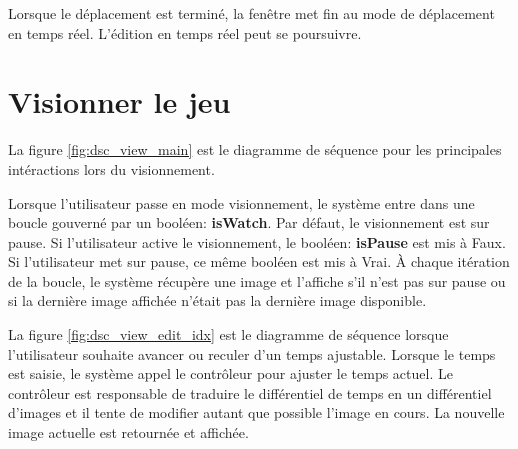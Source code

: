 Lorsque le déplacement est terminé, la fenêtre met fin au mode de déplacement en temps réel.
L'édition en temps réel peut se poursuivre.

\section{Visionner le jeu}
\label{sec:visionner_jeu}


La figure \ref{fig:dsc_view_main} est le diagramme de séquence pour les principales intéractions lors du visionnement.

Lorsque l'utilisateur passe en mode visionnement, le système entre dans une boucle gouverné par un booléen: \textbf{isWatch}.
Par défaut, le visionnement est sur pause.
Si l'utilisateur active le visionnement, le booléen: \textbf{isPause} est mis à Faux.
Si l'utilisateur met sur pause, ce même booléen est mis à Vrai.
À chaque itération de la boucle, le système récupère une image et l'affiche s'il n'est pas sur pause ou si la dernière image affichée n'était pas la dernière image disponible.


La figure \ref{fig:dsc_view_edit_idx} est le diagramme de séquence lorsque l'utilisateur souhaite avancer ou reculer d'un temps ajustable.
Lorsque le temps est saisie, le système appel le contrôleur pour ajuster le temps actuel.
Le contrôleur est responsable de traduire le différentiel de temps en un différentiel d'images et il tente de modifier autant que possible l'image en cours.
La nouvelle image actuelle est retournée et affichée.


